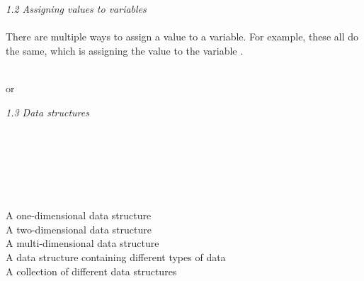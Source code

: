 \textit{1.2 Assigning values to variables} \\
\\
There are multiple ways to assign a value to a variable. For example, these all do the same, which is assigning the value  to the variable .\\
\\
\begin{center}
     or  \hspace{2.5cm}   \hspace{2.5cm}	 
\end{center}
\vspace*{0.5cm}
\textit{1.3 Data structures} \\
\\
\begin{minipage}[t]{.4\textwidth}
\vspace*{-8pt}
 \\ 				 
 \\				
 	\\			
 \\				 
\end{minipage}
\begin{minipage}[t]{.6\textwidth}
A one-dimensional data structure \\
A two-dimensional data structure \\
A multi-dimensional data structure \\
A data structure containing different types of data \\
A collection of different data structures
\end{minipage}
\vspace*{.5cm}

